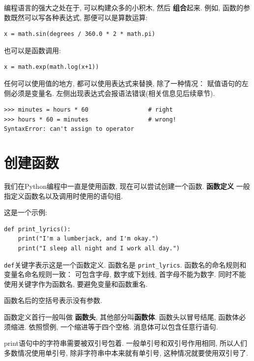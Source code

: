 \documentclass[10pt]{book}
\begin{document}
编程语言的强大之处在于, 可以构建众多的小积木, 然后 {\bf 组合}起来. 
例如, 函数的参数既然可以写各种表达式, 那便可以是算数运算:

\begin{verbatim}
x = math.sin(degrees / 360.0 * 2 * math.pi)
\end{verbatim}
%
也可以是函数调用:

\begin{verbatim}
x = math.exp(math.log(x+1))
\end{verbatim}
%
任何可以使用值的地方, 都可以使用表达式来替换, 除了一种情况：
赋值语句的左侧必须是变量名. 
左侧出现表达式会报语法错误(相关信息见后续章节). 

\begin{verbatim}
>>> minutes = hours * 60                 # right
>>> hours * 60 = minutes                 # wrong!
SyntaxError: can't assign to operator
\end{verbatim}
%


\section{创建函数}

我们在Python编程中一直是使用函数, 现在可以尝试创建一个函数. 
{\bf 函数定义} 一般指定义函数名以及调用时使用的语句组. 

这是一个示例:

\begin{verbatim}
def print_lyrics():
    print("I'm a lumberjack, and I'm okay.")
    print("I sleep all night and I work all day.")
\end{verbatim}
%

{\tt def}关键字表示这是一个函数定义. 
函数名是 \verb"print_lyrics". 
函数名的命名规则和变量名命名规则一致：
可包含字母, 数字或下划线, 首字母不能为数字. 
同时不能使用关键字作为函数名, 要避免变量和函数重名. 

函数名后的空括号表示没有参数. 

函数定义首行一般叫做 {\bf 函数头}, 其他部分叫{\bf 函数体}.
函数头以冒号结尾, 函数体必须缩进. 
依照惯例, 一个缩进等于四个空格. 
消息体可以包含任意行语句. 

print语句中的字符串需要被双引号包着. 
一般单引号和双引号作用相同, 所以人们多数情况使用单引号, 
除非字符串中本来就有单引号, 这种情况就要使用双引号了. 
\end{document}
